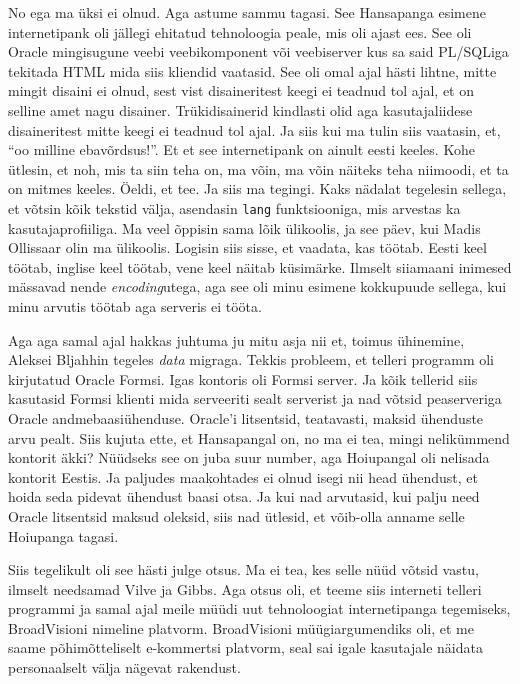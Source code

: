 No ega ma üksi ei olnud. Aga astume sammu tagasi. See Hansapanga esimene
internetipank oli jällegi ehitatud tehnoloogia peale, mis oli ajast ees. See
oli Oracle mingisugune veebi veebikomponent või veebiserver kus
sa said PL/SQLiga tekitada HTML mida siis kliendid
vaatasid. See oli omal ajal hästi lihtne, mitte mingit disaini ei olnud, sest
vist disaineritest keegi ei teadnud tol ajal, et on selline amet nagu disainer.
Trükidisainerid kindlasti olid aga kasutajaliidese disaineritest mitte keegi ei
teadnud tol ajal. Ja siis kui ma tulin siis vaatasin, et, \enquote{oo milline
ebavõrdsus!}. Et et see internetipank on ainult eesti keeles. Kohe ütlesin, et
noh, mis ta siin teha on, ma võin, ma võin näiteks teha niimoodi, et ta on
mitmes keeles. Öeldi, et tee. Ja siis ma tegingi. Kaks nädalat tegelesin
sellega, et võtsin kõik tekstid välja, asendasin \verb|lang| funktsiooniga, mis
arvestas ka kasutajaprofiiliga. Ma veel õppisin sama lõik ülikoolis, ja see
päev, kui Madis Ollissaar olin ma ülikoolis.
Logisin siis sisse, et vaadata, kas töötab. Eesti keel töötab, inglise keel
töötab, vene keel näitab küsimärke. Ilmselt siiamaani inimesed mässavad nende
\emph{encoding}utega, aga see oli minu esimene kokkupuude sellega, kui minu
arvutis töötab aga serveris ei tööta.

Aga aga samal ajal hakkas juhtuma ju mitu asja nii et, toimus ühinemine,
Aleksei Bljahhin tegeles \emph{data} migraga.
Tekkis probleem, et telleri programm oli kirjutatud Oracle Formsi. Igas
kontoris oli Formsi server. Ja kõik tellerid siis kasutasid Formsi klienti mida
serveeriti sealt serverist ja nad võtsid peaserveriga Oracle
andmebaasiühenduse. Oracle'i litsentsid, teatavasti, maksid ühenduste arvu
pealt. Siis kujuta ette, et Hansapangal on, no ma ei tea, mingi nelikümmend
kontorit äkki? Nüüdseks see on juba suur number, aga Hoiupangal oli nelisada
kontorit Eestis. Ja paljudes maakohtades ei olnud isegi nii head ühendust, et
hoida seda pidevat ühendust baasi otsa. Ja kui nad arvutasid, kui palju need
Oracle litsentsid maksud oleksid, siis nad ütlesid, et võib-olla anname selle
Hoiupanga tagasi. 

Siis tegelikult oli see hästi julge otsus. Ma ei tea, kes selle nüüd võtsid
vastu, ilmselt needsamad Vilve ja
Gibbs. Aga otsus oli, et teeme siis
interneti telleri programmi ja samal ajal meile müüdi uut tehnoloogiat
internetipanga tegemiseks, BroadVisioni nimeline platvorm.
BroadVisioni müügiargumendiks oli, et me saame põhimõtteliselt e-kommertsi
platvorm, seal sai igale kasutajale näidata personaalselt välja nägevat
rakendust.


